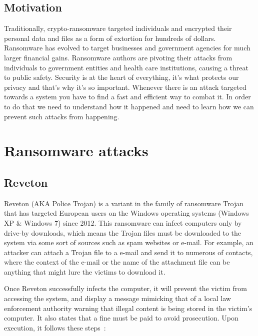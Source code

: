 \documentclass[10pt,a4paper]{article}
\begin{document}
\subsection{Motivation}
Traditionally, crypto-ransomware targeted individuals and encrypted their personal data and files as a form of extortion for hundreds of dollars. Ransomware has evolved to target businesses and government agencies for much larger financial gains. Ransomware authors are pivoting their attacks from individuals to government entities and health care institutions, causing a threat to public safety. Security is at the heart of everything, it's what protects our privacy and that's why it's so important. Whenever there is an attack targeted towards a system you have to find a fast and efficient way to combat it. In order to do that we need to understand how it happened and need to learn how we can prevent such attacks from happening.

\section{Ransomware attacks}

\subsection{Reveton}
Reveton (AKA Police Trojan) is a variant in the family of ransomware Trojan that has targeted European users on the Windows operating systems (Windows XP \& Windows 7) since 2012. This ransomware can infect computers only by drive-by downloads, which means the Trojan files must be downloaded to the system via some sort of sources such as spam websites or e-mail. For example, an attacker can attach a Trojan file to a e-mail and send it to numerous of contacts, where the context of the e-mail or the name of the attachment file can be anything that might lure the victims to download it.

Once Reveton successfully infects the computer, it will prevent the victim from accessing the system, and display a message mimicking that of a local law enforcement authority warning that illegal content is being stored in the victim’s computer. It also states that a fine must be paid to avoid prosecution.
Upon execution, it follows these steps~\cite{revetonanalysis}:
\end{document}
